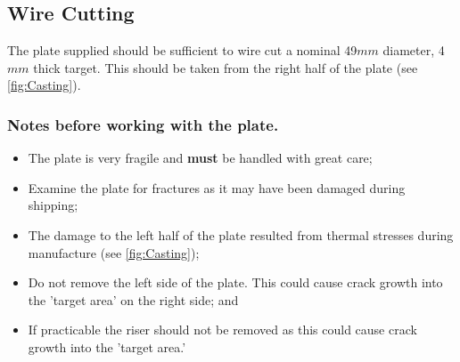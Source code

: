 \subsection{Wire Cutting}
The \MgZnCa plate supplied should be sufficient to wire cut a nominal 49$mm$ diameter, 4$mm$ thick target. This should be taken from the right half of the plate (see \ref{fig:Casting}). 

\subsubsection{Notes before working with the plate.}
\begin{itemize}
\item The \MgZnCa plate is very fragile and \textbf{must} be handled with great care; 
\item Examine the plate for fractures as it may have been damaged during shipping; 
\item The damage to the left half of the plate resulted from thermal stresses during manufacture (see \ref{fig:Casting});
\item Do not remove the left side of the plate. This could cause crack growth into the 'target area' on the right side; and
\item If practicable the riser should not be removed as this could cause crack growth into the 'target area.'
\end{itemize}